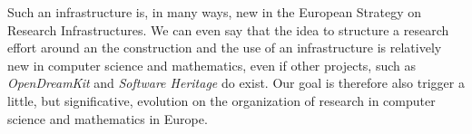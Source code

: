Such an infrastructure is, in many ways, new in the European Strategy
on Research Infrastructures. We can even say that the idea to
structure a research effort around an the construction and the use of
an infrastructure is relatively new in computer science and
mathematics, even if other projects, such as {\em OpenDreamKit} and
{\em Software Heritage} do exist. Our goal is therefore also trigger a
little, but significative, evolution on the organization of research
in computer science and mathematics in Europe.

